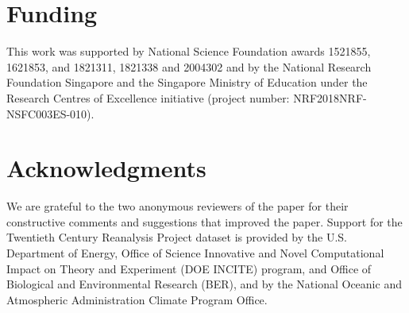 \documentclass[utf8]{frontiersSCNS} %
\begin{document}
\section*{Funding}
This work was supported by National Science Foundation awards 1521855, 1621853, and 1821311, 1821338  and 2004302 and by the National Research Foundation Singapore and the Singapore Ministry of Education under the Research Centres of Excellence initiative (project number: NRF2018NRF-NSFC003ES-010). 

\section*{Acknowledgments}
We are grateful to the two anonymous reviewers of the paper for their constructive comments and suggestions that improved the paper. Support for the Twentieth Century Reanalysis Project dataset is provided by the U.S. Department of Energy, Office of Science Innovative and Novel Computational Impact on Theory and Experiment (DOE INCITE) program, and Office of Biological and Environmental Research (BER), and by the National Oceanic and Atmospheric Administration Climate Program Office.




\end{document}
